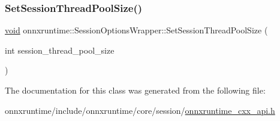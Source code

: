 \subsubsection{\texorpdfstring{Set\+Session\+Thread\+Pool\+Size()}{SetSessionThreadPoolSize()}}
{\footnotesize\ttfamily \mbox{\hyperlink{mlasi_8h_a88f941d423cb2a819b70a1358982b1a6}{void}} onnxruntime\+::\+Session\+Options\+Wrapper\+::\+Set\+Session\+Thread\+Pool\+Size (\begin{DoxyParamCaption}\item[{int}]{session\+\_\+thread\+\_\+pool\+\_\+size }\end{DoxyParamCaption})\hspace{0.3cm}{\ttfamily [inline]}}



The documentation for this class was generated from the following file\+:\begin{DoxyCompactItemize}
\item 
onnxruntime/include/onnxruntime/core/session/\mbox{\hyperlink{onnxruntime__cxx__api_8h}{onnxruntime\+\_\+cxx\+\_\+api.\+h}}\end{DoxyCompactItemize}
